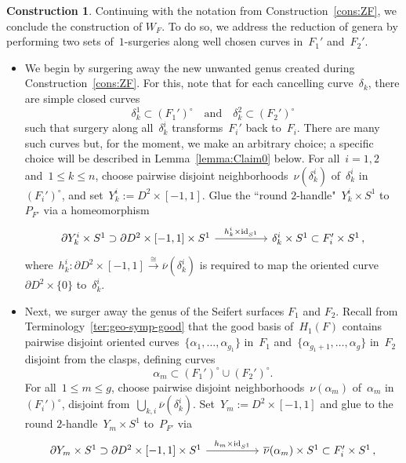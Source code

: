 \documentclass[10.9pt,a4paper]{amsart}
\theoremstyle{definition}
\newtheorem{construction}[theorem]{Construction}
\theoremstyle{remark}
\newcommand{\id}{\operatorname{id}}
\begin{document}
\begin{construction}
\label{cons:WF}
Continuing with the notation from Construction~\ref{cons:ZF},  we conclude the construction of $W_F$.
To do so, we address the reduction of genera by performing two sets of~$1$-surgeries along well chosen curves in~$F_1'$ and~$F_2'$. 
 \begin{itemize}
 \item We begin by surgering away the new unwanted genus created during Construction~\ref{cons:ZF}.
 For this,  note that for each cancelling curve~$\delta_k$, there are simple closed curves
$$\delta_k^1 \subset (F_1')^\circ \quad \text{and} \quad \delta_k^2 \subset (F_2')^\circ$$ such that surgery along all~$\delta_k^i$ transforms~$F_i'$ back to~$F_i$. 
There are many such curves but, for the moment, we make an arbitrary choice; a specific choice will be described in Lemma~\ref{lemma:Claim0} below.
For all~$i=1,2$ and~$1\le k\le n$, choose 
pairwise disjoint neighborhoods~$\nu(\delta_k^i)$ of~$\delta_k^i$ in~$(F_i')^\circ$, and set~$Y^i_k:= D^2 \times [-1,1]$.
Glue the ``round $2$-handle"~$Y^i_k\times S^1$ to~$P_{F'}$ via a homeomorphism
\begin{equation}
\label{eq:glue-Y}
\begin{tikzcd}
\partial Y^i_k\times S^1\supset \partial D^2\times [-1,1]\times S^1\arrow[rr,"h_k^i\times \id_{S^1}"]&&\delta_k^i\times S^1\subset F_i'\times S^1\,,
\end{tikzcd}
\end{equation}
where~$h_k^i\colon \partial D^2\times [-1,1]\xrightarrow{\cong}\overline{\nu}(\delta_k^i)$ is required to map the oriented curve~$\partial D^2\times\{0\}$ to~$\delta_k^i$.
 \item  Next, we surger away the genus of the Seifert surfaces $F_1$  and $F_2$.
Recall from Terminology~\ref{ter:geo-symp-good} that the good basis of~$H_1(F)$ contains pairwise disjoint oriented curves~$\{\alpha_1, \ldots, \alpha_{g_1}\}$ in~$F_1$ and~$\{\alpha_{g_1+1}, \ldots, \alpha_{g}\}$ in~$F_2$ disjoint from the clasps,
defining curves
$$\alpha_m \subset (F_1')^\circ\cup (F_2')^\circ.$$
For all~$1\le m\le g$, choose 
pairwise disjoint neighborhoods~$\nu(\alpha_m)$ of~$\alpha_m$ in~$(F_i')^\circ$, disjoint from~$\bigcup_{k,i}\overline{\nu}(\delta_k^i)$.
Set~$Y_m:= D^2 \times [-1,1]$ and glue to the round $2$-handle~$Y_m\times S^1$ to~$P_{F'}$ via
\[
\begin{tikzcd}
\partial Y_m\times S^1\supset \partial D^2\times [-1,1]\times S^1\arrow[rr,"h_m\times \id_{S^1}"]&&\overline{\nu}(\alpha_m)\times S^1\subset F_i'\times S^1\,,

\end{tikzcd}\]
\end{itemize}
\end{construction}
\end{document}

